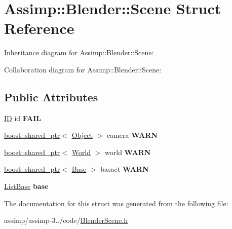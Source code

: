 \hypertarget{struct_assimp_1_1_blender_1_1_scene}{\section{Assimp\+:\+:Blender\+:\+:Scene Struct Reference}
\label{struct_assimp_1_1_blender_1_1_scene}
}


Inheritance diagram for Assimp\+:\+:Blender\+:\+:Scene\+:


Collaboration diagram for Assimp\+:\+:Blender\+:\+:Scene\+:
\subsection*{Public Attributes}
\begin{DoxyCompactItemize}
\item 
\hypertarget{struct_assimp_1_1_blender_1_1_scene_aece0758294668e58ea302acdd749c36d}{\hyperlink{struct_assimp_1_1_blender_1_1_i_d}{I\+D} id {\bfseries F\+A\+I\+L}}\label{struct_assimp_1_1_blender_1_1_scene_aece0758294668e58ea302acdd749c36d}

\item 
\hypertarget{struct_assimp_1_1_blender_1_1_scene_ac032b1659dffb59cf61a70bccb622953}{\hyperlink{classboost_1_1shared__ptr}{boost\+::shared\+\_\+ptr}$<$ \hyperlink{struct_assimp_1_1_blender_1_1_object}{Object} $>$ camera {\bfseries W\+A\+R\+N}}\label{struct_assimp_1_1_blender_1_1_scene_ac032b1659dffb59cf61a70bccb622953}

\item 
\hypertarget{struct_assimp_1_1_blender_1_1_scene_a9ee824bd7abbc7a53afc233c09b31340}{\hyperlink{classboost_1_1shared__ptr}{boost\+::shared\+\_\+ptr}$<$ \hyperlink{struct_assimp_1_1_blender_1_1_world}{World} $>$ world {\bfseries W\+A\+R\+N}}\label{struct_assimp_1_1_blender_1_1_scene_a9ee824bd7abbc7a53afc233c09b31340}

\item 
\hypertarget{struct_assimp_1_1_blender_1_1_scene_a7df7514400915559b087f3416e9b4b86}{\hyperlink{classboost_1_1shared__ptr}{boost\+::shared\+\_\+ptr}$<$ \hyperlink{struct_assimp_1_1_blender_1_1_base}{Base} $>$ basact {\bfseries W\+A\+R\+N}}\label{struct_assimp_1_1_blender_1_1_scene_a7df7514400915559b087f3416e9b4b86}

\item 
\hypertarget{struct_assimp_1_1_blender_1_1_scene_ae10986a8da78aa8e8d7aba43e2ed328c}{\hyperlink{struct_assimp_1_1_blender_1_1_list_base}{List\+Base} {\bfseries base}}\label{struct_assimp_1_1_blender_1_1_scene_ae10986a8da78aa8e8d7aba43e2ed328c}

\end{DoxyCompactItemize}


The documentation for this struct was generated from the following file\+:\begin{DoxyCompactItemize}
\item 
assimp/assimp-\/3../code/\hyperlink{_blender_scene_8h}{Blender\+Scene.\+h}\end{DoxyCompactItemize}
